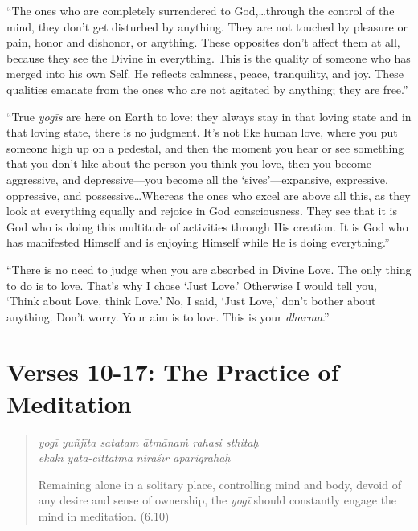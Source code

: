 \documentclass[12pt, twoside, openright]{memoir}
\begin{document}
\enquote{The ones who are completely surrendered to God,\ldots through the control of the mind, they don’t get disturbed by anything. They are not touched by pleasure or pain, honor and dishonor, or anything. These opposites don’t affect them at all, because they see the Divine in everything. This is the quality of someone who has merged into his own Self. He reflects calmness, peace, tranquility, and joy. These qualities emanate from the ones who are not agitated by anything; they are free.}

\enquote{True \textit{yogīs} are here on Earth to love: they always stay in that loving state and in that loving state, there is no judgment. It’s not like human love, where you put someone high up on a pedestal, and then the moment you hear or see something that you don’t like about the person you think you love, then you become aggressive, and depressive---you become all the \enquote{sives}---expansive, expressive, oppressive, and possessive\ldots Whereas the ones who excel are above all this, as they look at everything equally and rejoice in God consciousness. They see that it is God who is doing this multitude of activities through His creation. It is God who has manifested Himself and is enjoying Himself while He is doing everything.}

\enquote{There is no need to judge when you are absorbed in Divine Love. The only thing to do is to love. That’s why I chose \enquote{Just Love.} Otherwise I would tell you, \enquote{Think about Love, think Love.} No, I said, \enquote{Just Love,} don’t bother about anything. Don’t worry. Your aim is to love. This is your \textit{dharma}.}

\section{Verses 10-17: The Practice of Meditation}\label{sec-verses-10-17-the-practice-of-meditation}

\par
\begin{verse}
\textit{yogī yuñjīta satatam ātmānaṁ rahasi sthitaḥ} \\
\textit{ekākī yata-cittātmā nirāśīr aparigrahaḥ}

\noindent Remaining alone in a solitary place, controlling mind and body, devoid of any desire and sense of ownership, the \textit{yogī} should constantly engage the mind in meditation. (6.10)
\end{verse}
\par
\end{document}
